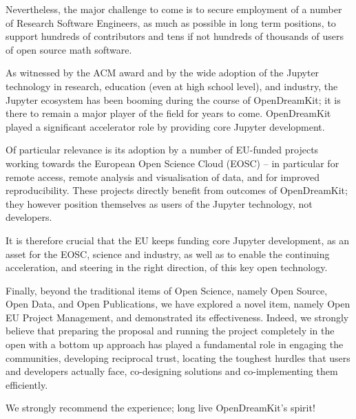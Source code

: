 Nevertheless, the major challenge to come is to secure employment of a number of Research Software Engineers, as much as possible 
in long term positions, to support hundreds of contributors and tens if not hundreds of thousands of users of open source math software.

As witnessed by the ACM award and by the wide adoption of the Jupyter technology in research, education (even at high school level), 
and industry, the Jupyter ecosystem has been booming during the course of OpenDreamKit; it is there to remain a major player of the 
field for years to come. OpenDreamKit played a significant accelerator role by providing core Jupyter development.

Of particular relevance is its adoption by a number of EU-funded projects working towards the European Open Science Cloud (EOSC) – 
in particular for remote access, remote analysis and visualisation of data, and for improved reproducibility. These projects directly 
benefit from outcomes of OpenDreamKit; they however position themselves as users of the Jupyter technology, not developers.

It is therefore crucial that the EU keeps funding core Jupyter development, as an asset for the EOSC, science and industry, 
as well as to enable the continuing acceleration, and steering in the right direction, of this key open technology.

Finally, beyond the traditional items of Open Science, namely Open Source, Open Data, and Open Publications, we have explored 
a novel item, namely Open EU Project Management, and demonstrated its effectiveness. Indeed, we strongly believe that preparing 
the proposal and running the project completely in the open with a bottom up approach has played a fundamental role in engaging 
the communities, developing reciprocal trust, locating the toughest hurdles that users and developers actually face, co-designing 
solutions and co-implementing them efficiently.

We strongly recommend the experience; long live OpenDreamKit’s spirit!
